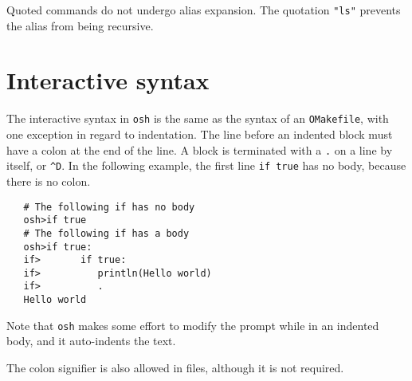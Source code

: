 Quoted commands do not undergo alias expansion.  The quotation \verb+"ls"+ prevents the alias from
being recursive.

\section{Interactive syntax}

The interactive syntax in \verb+osh+ is the same as the syntax of an \verb+OMakefile+, with one
exception in regard to indentation.  The line before an indented block must have a colon at the end
of the line.  A block is terminated with a \verb+.+ on a line by itself, or \verb+^D+.  In the
following example, the first line \verb+if true+ has no body, because there is no colon.

\begin{verbatim}
   # The following if has no body
   osh>if true
   # The following if has a body
   osh>if true:
   if>       if true:
   if>          println(Hello world)
   if>          .
   Hello world
\end{verbatim}

Note that \verb+osh+ makes some effort to modify the prompt while in an indented body, and it
auto-indents the text.

The colon signifier is also allowed in files, although it is not required.

